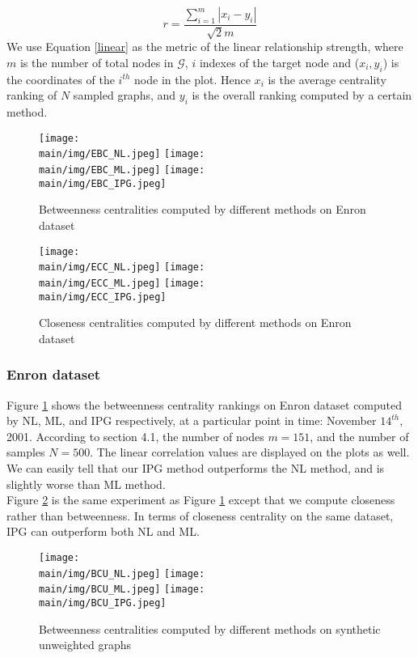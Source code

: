\documentclass[\main/thesis.tex]{subfiles}
\begin{document}
\begin{equation}
r = \frac{\sum_{i=1}^{m} |x_i - y_i|}{\sqrt{2}m} \label{linear}
\end{equation}
We use Equation \ref{linear} as the metric of the linear relationship strength, where $m$ is the number of total nodes in $\mathcal{G}$, $i$ indexes of the target node and ($x_i, y_i$) is the coordinates of the $i^{th}$ node in the plot. Hence $x_i$ is  the average centrality ranking of $N$ sampled graphs, and $y_i$ is the overall ranking computed by a certain method.





\begin{figure}
\texttt{[image: \\main/img/EBC\_NL.jpeg]}
\texttt{[image: \\main/img/EBC\_ML.jpeg]}
\centering
\texttt{[image: \\main/img/EBC\_IPG.jpeg]}

\caption{Betweenness centralities computed by different methods on Enron dataset}
\label{btw_enron}
\end{figure}

\begin{figure}
\texttt{[image: \\main/img/ECC\_NL.jpeg]}
\texttt{[image: \\main/img/ECC\_ML.jpeg]}
\centering
\texttt{[image: \\main/img/ECC\_IPG.jpeg]}
\caption{Closeness centralities computed by different methods on Enron dataset}
\label{cl_enron}
\end{figure}


\subsubsection{Enron dataset}
Figure \ref{btw_enron} shows the betweenness centrality rankings on Enron dataset computed by NL, ML, and IPG respectively, at a particular point in time: November $14^{th}$, 2001. According to section 4.1, the number of nodes $m = 151$, and the number of samples $N = 500$. The linear correlation values are displayed on the plots as well. We can easily tell that our IPG method outperforms the NL method, and is slightly worse than ML method.\\
Figure \ref{cl_enron} is the same experiment as Figure \ref{btw_enron} except that we compute closeness rather than betweenness. In terms of closeness centrality on the same dataset, IPG can outperform both NL and ML.



\begin{figure}
\texttt{[image: \\main/img/BCU\_NL.jpeg]}
\texttt{[image: \\main/img/BCU\_ML.jpeg]}
\centering
\texttt{[image: \\main/img/BCU\_IPG.jpeg]}
\caption{Betweenness centralities computed by different methods on synthetic unweighted graphs}
\label{btw_unweighted}
\end{figure}
\end{document}
